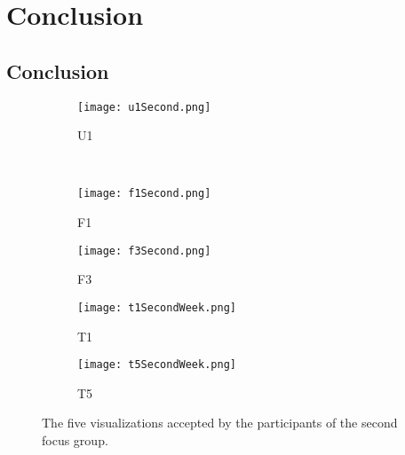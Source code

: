 \chapter{Conclusion}

\section{Conclusion}

\begin{figure}[h!]
  \begin{subfigure}[b]{0.4\textwidth}
    \centering
    \texttt{[image: u1Second.png]}
    \caption{U1}
  \end{subfigure} 
  \\
  \begin{subfigure}[b]{0.49\textwidth}
    \centering
    \texttt{[image: f1Second.png]}
    \caption{F1}
  \end{subfigure} 
  \begin{subfigure}[b]{0.49\textwidth}
    \centering
    \texttt{[image: f3Second.png]}
    \caption{F3}
  \end{subfigure}
  \begin{subfigure}[b]{0.49\textwidth}
    \centering
    \texttt{[image: t1SecondWeek.png]}
    \caption{T1}
  \end{subfigure} 
  \begin{subfigure}[b]{0.49\textwidth}
    \centering
    \texttt{[image: t5SecondWeek.png]}
    \caption{T5}
  \end{subfigure}
  \caption{The five visualizations accepted by the participants of the second focus group.}
  \label{fig:visualizations}
\end{figure}

